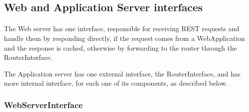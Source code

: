 			\subsection{Web and Application Server interfaces}
				\paragraph{}
					The Web server has one interface, responsible for receiving REST requests and handle them by responding directly, if the request comes from a WebApplication and the response is cached, otherwise by forwarding to the router through the RouterInterface. 
					
					The Application server has one external interface, the RouterInterface, and has more internal interface, for each one of its components, as described below.
				\clearpage
				\subsubsection{WebServerInterface}
